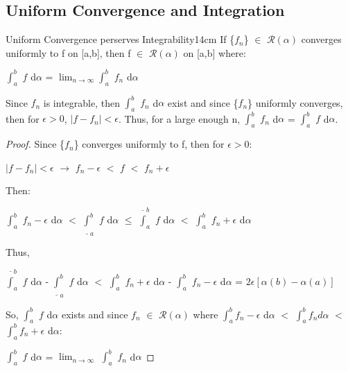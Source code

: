 \subsection[ Integration ]{ Uniform Convergence and Integration }

    \begin{wtheorem}{Uniform Convergence perserves Integrability}{14cm}
        If \{$f_n$\} $\in$ $\mathscr{R}(\alpha)$ converges uniformly to f on [a,b],
        then f $\in$ $\mathscr{R}(\alpha)$ on [a,b] where:

        \hspace{0.5cm}
        $\int_a^b$ $f$ d$\alpha$
        = $\lim_{n \rightarrow \infty} \int_a^b$ $f_n$ d$\alpha$        
    \end{wtheorem}

    \begin{intuition}
        Since $f_n$ is integrable, then $\int_a^b$ $f_n$ d$\alpha$ exist
        and since \{$f_n$\} uniformly converges, then for $\epsilon > 0$,
        $|f - f_n| < \epsilon$.
        Thus, for a large enough n,
        $\int_a^b$ $f_n$ d$\alpha$ = $\int_a^b$ $f$ d$\alpha$.
    \end{intuition}

    \vspace{0.1cm}

    \begin{proof}
        Since \{$f_n$\} converges uniformly to f, then for $\epsilon > 0$:

        \hspace{0.5cm}
        $|f - f_n| < \epsilon$
        \hspace{1cm}
        $\rightarrow$
        \hspace{1cm}
        $f_n - \epsilon$ $<$ $f$ $<$ $f_n + \epsilon$

        Then:

        \hspace{0.5cm}
        $\int_{a}^{b}$ $f_n - \epsilon$ d$\alpha$
        $<$ $\underline{\int}_{a}^{b}$ $f$ d$\alpha$
        $\leq$ $\overline{\int}_{a}^{b}$ $f$ d$\alpha$
        $<$ $\int_{a}^{b}$ $f_n + \epsilon$ d$\alpha$

        Thus,

        \hspace{0.5cm}
        $\overline{\int}_{a}^{b}$ $f$ d$\alpha$
            - $\underline{\int}_{a}^{b}$ $f$ d$\alpha$
        $<$ $\int_{a}^{b}$ $f_n + \epsilon$ d$\alpha$
            - $\int_{a}^{b}$ $f_n - \epsilon$ d$\alpha$
        = $2\epsilon[\alpha(b) - \alpha(a)]$

        So, $\int_a^b$ $f$ d$\alpha$ exists and since
        $f_n$ $\in$ $\mathscr{R}(\alpha)$ where 
        $\int_{a}^{b} f_n - \epsilon$ d$\alpha$
        $<$ $\int_{a}^{b} f_n d\alpha$
        $<$ $\int_{a}^{b} f_n + \epsilon$ d$\alpha$:

        \hspace{0.5cm}
        $\int_{a}^{b}$ $f$ d$\alpha$
        = $\lim_{n \rightarrow \infty}$ $\int_{a}^{b}$ $f_n$ d$\alpha$
    \end{proof}

